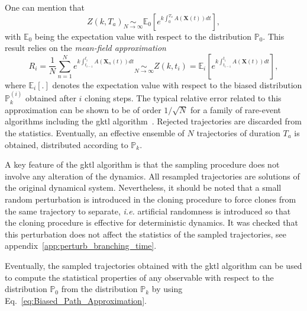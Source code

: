 %
One can mention that
\begin{equation}
\label{eq:mean_field}
Z(k,T_a) \underset{N\to \infty}{\sim} \mathbb{E}_0\left[e^{k\int_{0}^{T_{a}}A(\mathbf{X}(t))dt}\right],
\end{equation}
with $\mathbb{E}_{0}$ being the expectation value with respect to the
distribution $\mathbb{P}_{0}$.
This result relies on the \textit{mean-field approximation}
\begin{equation}
R_{i}=\frac{1}{N}\sum_{n=1}^{N}e^{k\int_{t_{i-1}}^{t_{i}}A(\mathbf{X}_{n}(t))dt}\underset{N\rightarrow\infty}{\sim} Z(k,t_i)= \mathbb{E}_{i}\left[e^{k\int_{t_{i-1}}^{t_{i}}A(\mathbf{X}(t))dt}\right],
\label{eq:Mean_Field_Approximation}
\end{equation}
where $\mathbb{E}_{i}[.]$ denotes the expectation value with respect to the biased distribution $\mathbb{P}_k^{(i)}$ obtained after $i$ cloning steps.
The typical relative error related to this approximation can be shown to be of order $1/\sqrt{N}$ for a family of rare-event algorithms including the \ac{gktl} algorithm~\citep{DelMoralBook,DelMoral2013}.
%
Rejected trajectories are discarded from the statistics.
Eventually, an effective ensemble of $N$ trajectories of duration $T_{a}$ is obtained, distributed according to $\mathbb{P}_{k}$.

A key feature of the \ac{gktl} algorithm is that the sampling procedure does not involve any alteration of the dynamics.
All resampled trajectories are solutions of the original dynamical system.
Nevertheless, it should be noted that a small random perturbation is introduced in the cloning procedure to force clones from the same trajectory to separate, \emph{i.e.} artificial randomness is introduced so that the cloning procedure is effective for deterministic dynamics.
It was checked that this perturbation does not affect the statistics of the sampled trajectories, see appendix~\ref{app:perturb_branching_time}.

Eventually, the sampled trajectories obtained with the \ac{gktl} algorithm can be used to compute the statistical properties of any observable with respect to the distribution $\mathbb{P}_{0}$ from the distribution $\mathbb{P}_{k}$ by using Eq.~\eqref{eq:Biased_Path_Approximation}.

